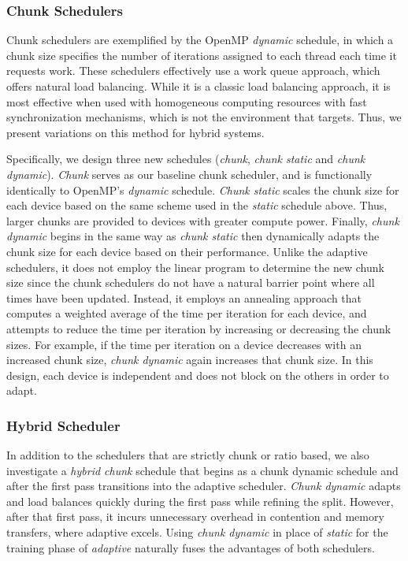 \subsubsection{Chunk Schedulers}

Chunk schedulers are exemplified by the OpenMP \emph{dynamic} schedule, in
which a chunk size specifies the number of iterations assigned to each thread
each time it requests work.  These schedulers effectively use a work queue approach, which
offers natural load balancing. While it is a classic load balancing approach,
it is most effective when used with homogeneous computing resources with fast
synchronization mechanisms, which is not the environment that \tsar targets.
Thus, we present variations on this method for hybrid systems.

Specifically, we design three new schedules (\emph{chunk}, \emph{chunk static}
and \emph{chunk dynamic}). \emph{Chunk} serves as our baseline chunk
scheduler, and is functionally identically to OpenMP's \emph{dynamic}
schedule. \emph{Chunk static} scales the chunk size for each device based on
the same scheme used in the \emph{static} schedule above. Thus, larger chunks
are provided to devices with greater compute power.  Finally, \emph{chunk
  dynamic} begins in the same way as \emph{chunk static} then dynamically
adapts the chunk size for each device based on their performance.  Unlike the
adaptive schedulers, it does not employ the linear program to determine the
new chunk size since the chunk schedulers do not have a natural barrier point
where all times have been updated. Instead, it employs an annealing approach
that computes a weighted average of the time per iteration for each device,
and attempts to reduce the time per iteration by increasing or decreasing the
chunk sizes. For example, if the time per iteration on a device decreases with
an increased chunk size, \emph{chunk dynamic} again increases that chunk size.
In this design, each device is independent and does not block on the others in
order to adapt.

\subsubsection{Hybrid Scheduler}

In addition to the schedulers that are strictly chunk or ratio based, we also
investigate a \emph{hybrid chunk} schedule that begins as a chunk dynamic
schedule and after the first pass transitions into the adaptive scheduler.
\emph{Chunk dynamic} adapts and load balances quickly during the first pass
while refining the split. However, after that first pass, it incurs
unnecessary overhead in contention and memory transfers, where adaptive
excels.  Using \emph{chunk dynamic} in place of \emph{static} for the training
phase of \emph{adaptive} naturally fuses the advantages of both schedulers.

